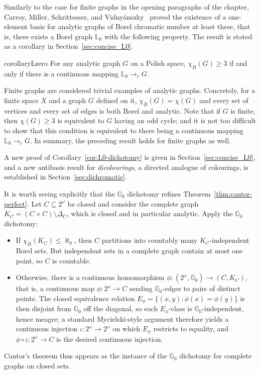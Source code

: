 Similarly to the case for finite graphs in the opening paragraphs of the chapter, Carroy, Miller, Schrittesser, and Vidny{\'{a}}nszky~\cite{L0paper} proved the existence of a one-element basis for analytic graphs of Borel chromatic number at least three, that is, there exists a Borel graph $\mathbb{L}_0$ with the following property.
The result is stated as a corollary in Section~\ref{sec:concise_L0}.

\begin{restatable}{corollary}{Lzero}\label{cor:L0-dichotomy}
    For any analytic graph $G$ on a Polish space, $\chi_B(G)\geq 3$ if and only if there is a continuous mapping $\mathbb{L}_0\to_cG$.
\end{restatable}

\begin{remark}\label{rmk:finite-Borel}
    Finite graphs are considered trivial examples of analytic graphs.
    Concretely, for a finite space $X$ and a graph $G$ defined on it, $\chi_B(G)=\chi(G)$ and every set of vertices and every set of edges is both Borel and analytic.
    Note that if $G$ is finite, then $\chi(G)\geq3$ is equivalent to $G$ having an odd cycle;
    and it is not too difficult to show that this condition is equivalent to there being a continuous mapping $\mathbb{L}_0\to_cG$.
    In summary, the preceding result holds for finite graphs as well.
\end{remark}

A new proof of Corollary~\ref{cor:L0-dichotomy} is given in Section~\ref{sec:concise_L0}, and a new antibasis result for \emph{dicolourings}, a directed analogue of colourings, is established in Section~\ref{sec:dichromatic}.

It is worth seeing explicitly that the $\mathbb{G}_0$ dichotomy refines Theorem~\ref{thm:cantor-perfect}.
Let $C \subseteq 2^\omega$ be closed and consider the complete graph $K_C = (C \times C) \setminus \Delta_C$, which is closed and in particular analytic.
Apply the $\mathbb{G}_0$ dichotomy:
\begin{itemize}
    \item If $\chi_B(K_C) \leq \aleph_0$, then $C$ partitions into countably many $K_C$-independent Borel sets.
    But independent sets in a complete graph contain at most one point, so $C$ is countable.
    \item Otherwise, there is a continuous homomorphism $\phi\colon (2^\omega, \mathbb{G}_0) \to (C, K_C)$, that is, a continuous map $\phi\colon 2^\omega \to C$ sending $\mathbb{G}_0$-edges to pairs of distinct points.
    The closed equivalence relation $E_\phi = \{(x,y) : \phi(x) = \phi(y)\}$ is then disjoint from $\mathbb{G}_0$ off the diagonal, so each $E_\phi$-class is $\mathbb{G}_0$-independent, hence meagre; a standard Mycielski-style argument therefore yields a continuous injection $\iota\colon 2^\omega \to 2^\omega$ on which $E_\phi$ restricts to equality, and $\phi \circ \iota\colon 2^\omega \to C$ is the desired continuous injection.
\end{itemize}
Cantor's theorem thus appears as the instance of the $\mathbb{G}_0$ dichotomy for complete graphs on closed sets.

